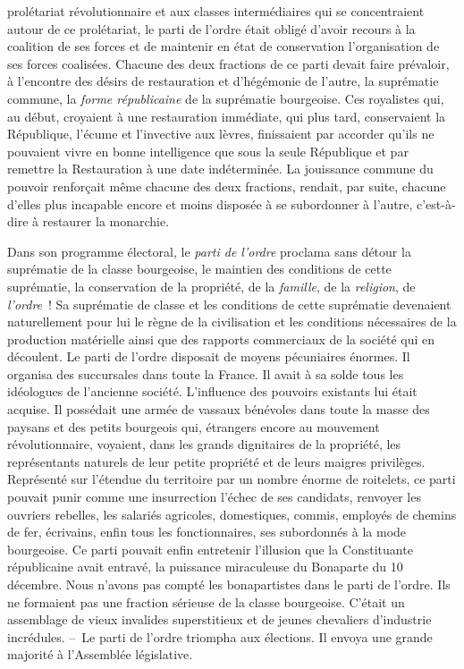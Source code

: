 \documentclass[french,twoside]{book} %
\begin{document}
prolétariat révolutionnaire et aux classes intermédiaires qui se concentraient autour de ce prolétariat, le parti de l’ordre était obligé d’avoir recours à la coalition de ses forces et de maintenir en état de conservation l’organisation de ses forces coalisées. Chacune des deux fractions de ce parti devait faire prévaloir, à l’encontre des désirs de restauration et d’hégémonie de l’autre, la suprématie commune, la \emph{forme républicaine} de la suprématie bourgeoise. Ces royalistes qui, au début, croyaient à une restauration immédiate, qui plus tard, conservaient la République, l’écume et l’invective aux lèvres, finissaient par accorder qu’ils ne pouvaient vivre en bonne intelligence que sous la seule République et par remettre la Restauration à une date indéterminée. La jouissance commune du pouvoir renforçait même chacune des deux fractions, rendait, par suite, chacune d’elles plus incapable encore et moins disposée à se subordonner à l’autre, c’est-à-dire à restaurer la monarchie.\par
Dans son programme électoral, le \emph{parti de l’ordre} proclama sans détour la suprématie de la classe bourgeoise, le maintien des conditions de cette suprématie, la conservation de la propriété, de la \emph{famille}, de la \emph{religion}, de \emph{l’ordre} ! Sa suprématie de classe et les conditions de cette suprématie devenaient naturellement pour lui le règne de la civilisation et les conditions nécessaires de la production matérielle ainsi que des rapports commerciaux de la société qui en découlent. Le parti de l’ordre disposait de moyens pécuniaires énormes. Il organisa des succursales dans toute la France. Il avait à sa solde tous les idéologues de l’ancienne société. L’influence des pouvoirs existants lui était acquise. Il possédait une armée de vassaux bénévoles dans toute la masse des paysans et des petits bourgeois qui, étrangers encore au mouvement révolutionnaire, voyaient, dans les grands dignitaires de la propriété, les représentants naturels de leur petite propriété et de leurs maigres privilèges. Représenté sur l’étendue du territoire par un nombre énorme de roitelets, ce parti pouvait punir comme une insurrection l’échec de ses candidats, renvoyer les ouvriers rebelles, les salariés agricoles, domestiques, commis, employés de chemins de fer, écrivains, enfin tous les fonctionnaires, ses subordonnés à la mode bourgeoise. Ce parti pouvait enfin entretenir l’illusion que la Constituante républicaine avait entravé, la puissance miraculeuse du Bonaparte du 10 décembre. Nous n’avons pas compté les bonapartistes dans le parti de l’ordre. Ils ne formaient pas une fraction sérieuse de la classe bourgeoise. C’était un assemblage de vieux invalides superstitieux et de jeunes chevaliers d’industrie incrédules. – Le parti de l’ordre triompha aux élections. Il envoya une grande majorité à l’Assemblée législative.\par
\end{document}
